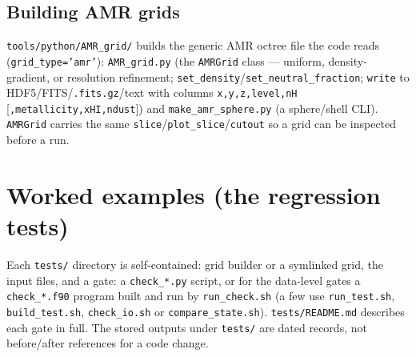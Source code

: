 \documentclass[english,a4paper]{my_memo}
\newcommand{\code}[1]{\texttt{#1}}
\begin{document}
\subsection{Building AMR grids}
\code{tools/python/AMR\_grid/} builds the generic AMR octree file the code
reads (\code{grid\_type='amr'}): \code{AMR\_grid.py} (the \code{AMRGrid}
class --- uniform, density-gradient, or resolution refinement;
\code{set\_density}/\code{set\_neutral\_fraction}; \code{write} to
HDF5/FITS/\code{.fits.gz}/text with columns \code{x,y,z,level,nH}
[\code{,metallicity,xHI,ndust}]) and \code{make\_amr\_sphere.py} (a
sphere/shell CLI).  \code{AMRGrid} carries the same
\code{slice}/\code{plot\_slice}/\code{cutout} so a grid can be inspected
before a run.

\section{Worked examples (the regression tests)}
Each \code{tests/} directory is self-contained: grid builder or a
symlinked grid, the input files, and a gate: a \code{check\_*.py} script,
or for the data-level gates a \code{check\_*.f90} program built and run by
\code{run\_check.sh} (a few use \code{run\_test.sh}, \code{build\_test.sh},
\code{check\_io.sh} or \code{compare\_state.sh}).  \code{tests/README.md}
describes each gate in full.  The stored outputs under \code{tests/} are
dated records, not before/after references for a code change.
\end{document}
